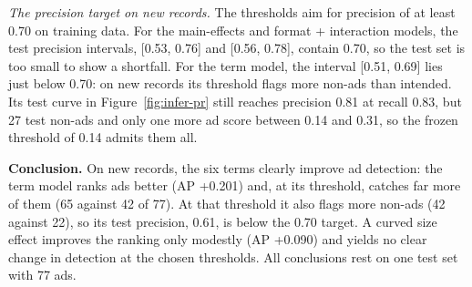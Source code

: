 \emph{The precision target on new records.} The thresholds aim for precision
of at least 0.70 on training data. For the main-effects and format +
interaction models, the test precision intervals, [0.53, 0.76] and
[0.56, 0.78], contain 0.70, so the test set is too small to show a shortfall.
For the term model, the interval [0.51, 0.69] lies just below 0.70: on new
records its threshold flags more non-ads than intended. Its test curve in
Figure~\ref{fig:infer-pr} still reaches precision 0.81 at recall 0.83, but
27 test non-ads and only one more ad score between 0.14 and 0.31, so the
frozen threshold of 0.14 admits them all.

\textbf{Conclusion.} On new records, the six terms clearly improve ad
detection: the term model ranks ads better (AP +0.201) and, at its
threshold, catches far more of them (65 against 42 of 77). At that threshold
it also flags more non-ads (42 against 22), so its test precision, 0.61, is
below the 0.70 target. A curved size effect improves the ranking only
modestly (AP +0.090) and yields no clear change in detection at the chosen
thresholds. All conclusions rest on one test set with 77 ads.
